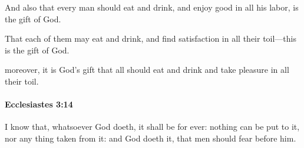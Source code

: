 			\begin{versebox}
					\item[BHS] 
					\item[LXX] 
					\item[ASV] And also that every man should eat and drink, and enjoy good in all his labor, is the gift of God.
					\item[NIV] That each of them may eat and drink, and find satisfaction in all their toil—this is the gift of God.
					\item[NRSV] moreover, it is God’s gift that all should eat and drink and take pleasure in all their toil.
			\end{versebox}

		\paragraph{Ecclesiastes 3:14} %
			\label{ECCLESIASTES-3-14}

			I know that, whatsoever God doeth, it shall be for ever: nothing can be put to it, nor any thing taken from it: and God doeth it, that men should fear before him.

